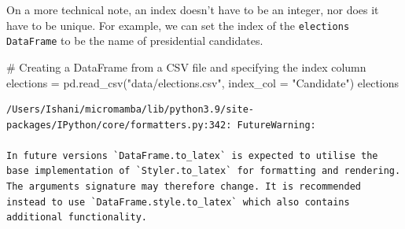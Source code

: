 \documentclass[
  letterpaper,
  DIV=11,
  numbers=noendperiod]{scrreprt}
\newenvironment{Shaded}{\begin{snugshade}}{\end{snugshade}}
\newcommand{\CommentTok}[1]{\textcolor[rgb]{0.37,0.37,0.37}{#1}}
\newcommand{\NormalTok}[1]{\textcolor[rgb]{0.00,0.23,0.31}{#1}}
\newcommand{\OperatorTok}[1]{\textcolor[rgb]{0.37,0.37,0.37}{#1}}
\newcommand{\StringTok}[1]{\textcolor[rgb]{0.13,0.47,0.30}{#1}}
\begin{document}
On a more technical note, an index doesn't have to be an integer, nor
does it have to be unique. For example, we can set the index of the
\texttt{elections} \texttt{DataFrame} to be the name of presidential
candidates.

\begin{Shaded}
\begin{Highlighting}[]
\CommentTok{\# Creating a DataFrame from a CSV file and specifying the index column}
\NormalTok{elections }\OperatorTok{=}\NormalTok{ pd.read\_csv(}\StringTok{"data/elections.csv"}\NormalTok{, index\_col }\OperatorTok{=} \StringTok{"Candidate"}\NormalTok{)}
\NormalTok{elections}
\end{Highlighting}
\end{Shaded}

\begin{verbatim}
/Users/Ishani/micromamba/lib/python3.9/site-packages/IPython/core/formatters.py:342: FutureWarning:

In future versions `DataFrame.to_latex` is expected to utilise the base implementation of `Styler.to_latex` for formatting and rendering. The arguments signature may therefore change. It is recommended instead to use `DataFrame.style.to_latex` which also contains additional functionality.
\end{verbatim}
\end{document}
